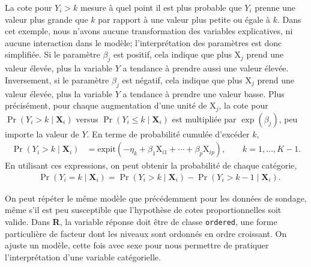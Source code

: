 \documentclass[
  11pt,
  letterpaper,
]{scrbook}
\theoremstyle{definition}
\theoremstyle{remark}
\begin{document}
La cote pour \(Y_i > k\) mesure à quel point il est plus probable que
\(Y_i\) prenne une valeur plus grande que \(k\) par rapport à une valeur
plus petite ou égale à \(k\). Dans cet exemple, nous n'avons aucune
transformation des variables explicatives, ni aucune interaction dans le
modèle; l'interprétation des paramètres est donc simplifiée. Si le
paramètre \(\beta_j\) est positif, cela indique que plus
\(\mathrm{X}_j\) prend une valeur élevée, plus la variable \(Y\) a
tendance à prendre aussi une valeur élevée. Inversement, si le paramètre
\(\beta_j\) est négatif, cela indique que plus \(\mathrm{X}_j\) prend
une valeur élevée, plus la variable \(Y\) a tendance à prendre une
valeur basse. Plus précisément, pour chaque augmentation d'une unité de
\(\mathrm{X}_j\), la cote pour \(\Pr(Y_i > k \mid \mathbf{X}_i)\) versus
\(\Pr(Y_i \leq k \mid \mathbf{X}_i)\) est multipliée par
\(\exp(\beta_j)\), peu importe la valeur de \(Y\). En terme de
probabilité cumulée d'excéder \(k\), \begin{align*}
\Pr(Y_i > k \mid \mathbf{X}_i) &= \textrm{expit}(-\eta_k + \beta_1 \mathrm{X}_{i1} + \cdots + \beta_p \mathrm{X}_{ip}), \qquad k=1, \ldots, K-1.
\end{align*} En utilisant ces expressions, on peut obtenir la
probabilité de chaque catégorie, \begin{align*}
&\Pr(Y_i = k \mid \mathbf{X}_{i}) =\Pr(Y_i > k \mid \mathbf{X}_{i}) - \Pr(Y_i > k-1 \mid \mathbf{X}_{i}).
\end{align*}

On peut répéter le même modèle que précédemment pour les données de
sondage, même s'il est peu susceptible que l'hypothèse de cotes
proportionnelles soit valide. Dans \textbf{R}, la variable réponse doit
être de classe \texttt{ordered}, une forme particulière de facteur dont
les niveaux sont ordonnés en ordre croissant. On ajuste un modèle, cette
fois avec sexe pour nous permettre de pratiquer l'interprétation d'une
variable catégorielle.
\end{document}
